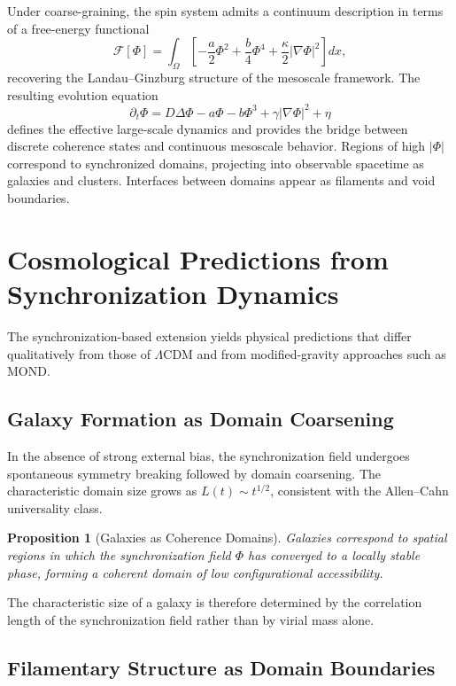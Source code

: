 \documentclass[11pt, a4paper, twocolumn]{article}
\newtheorem{proposition}[definition]{Proposition}
\newcommand{\F}{\mathcal{F}}
\begin{document}
Under coarse-graining, the spin system admits a continuum description in terms
of a free-energy functional
\[
\F[\Phi]
=
\int_\Omega
\left[
-\frac{a}{2}\Phi^2
+ \frac{b}{4}\Phi^4
+ \frac{\kappa}{2}|\nabla\Phi|^2
\right] dx,
\]
recovering the Landau--Ginzburg structure of the mesoscale framework. The
resulting evolution equation
\[
\partial_t \Phi
=
D\Delta\Phi - a\Phi - b\Phi^3 + \gamma|\nabla\Phi|^2 + \eta
\]
defines the effective large-scale dynamics and provides the bridge between
discrete coherence states and continuous mesoscale behavior. Regions of high
$|\Phi|$ correspond to synchronized domains, projecting into observable
spacetime as galaxies and clusters. Interfaces between domains appear as
filaments and void boundaries.

\section{Cosmological Predictions from Synchronization Dynamics}

The synchronization-based extension yields physical predictions that differ
qualitatively from those of $\Lambda$CDM and from modified-gravity approaches
such as MOND.

\subsection{Galaxy Formation as Domain Coarsening}

In the absence of strong external bias, the synchronization field undergoes
spontaneous symmetry breaking followed by domain coarsening. The characteristic
domain size grows as $L(t) \sim t^{1/2}$, consistent with the Allen--Cahn
universality class.

\begin{proposition}[Galaxies as Coherence Domains]
Galaxies correspond to spatial regions in which the synchronization field $\Phi$
has converged to a locally stable phase, forming a coherent domain of low
configurational accessibility.
\end{proposition}

The characteristic size of a galaxy is therefore determined by the correlation
length of the synchronization field rather than by virial mass alone.

\subsection{Filamentary Structure as Domain Boundaries}
\end{document}
